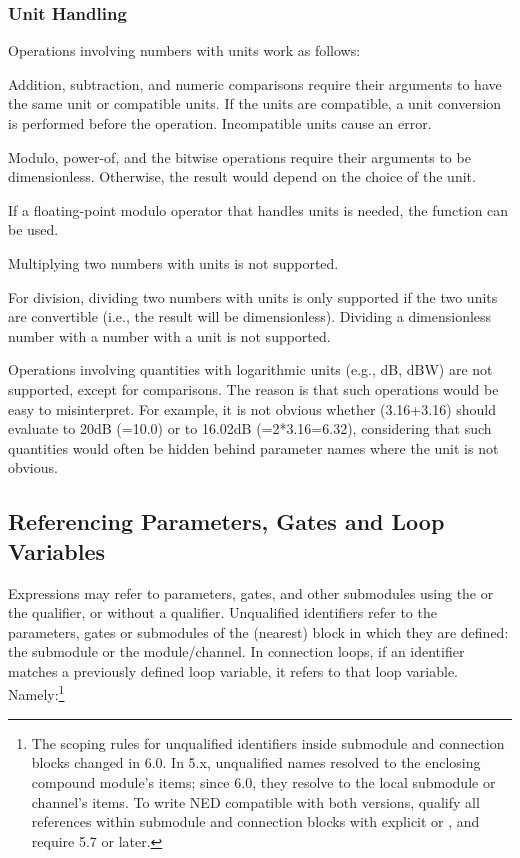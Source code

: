 \subsubsection{Unit Handling}
\label{sec:ned-ref:unit-handling}

Operations involving numbers with units work as follows:

Addition, subtraction, and numeric comparisons require their arguments to have
the same unit or compatible units. If the units are compatible, a unit
conversion is performed before the operation. Incompatible units cause an error.

Modulo, power-of, and the bitwise operations require their arguments to be
dimensionless. Otherwise, the result would depend on the choice of the unit.

\begin{note}
If a floating-point modulo operator that handles units is needed, the
 function can be used.
\end{note}

Multiplying two numbers with units is not supported.

For division, dividing two numbers with units is only supported if the two units
are convertible (i.e., the result will be dimensionless). Dividing a
dimensionless number with a number with a unit is not supported.

Operations involving quantities with logarithmic units (e.g., dB, dBW) are not
supported, except for comparisons. The reason is that such operations would be
easy to misinterpret. For example, it is not obvious whether 
(3.16+3.16) should evaluate to 20dB (=10.0) or to 16.02dB (=2*3.16=6.32),
considering that such quantities would often be hidden behind parameter names
where the unit is not obvious.


\subsection{Referencing Parameters, Gates and Loop Variables}
\label{sec:ned-ref:referencing-parameters-and-loop-variables}

Expressions may refer to parameters, gates, and other submodules using the
 or the  qualifier, or without a qualifier.
Unqualified identifiers refer to the parameters, gates or submodules of the
(nearest) block in which they are defined: the submodule or the module/channel.
In connection  loops, if an identifier matches a previously
defined loop variable, it refers to that loop variable.
Namely:\footnote{The scoping rules for unqualified identifiers inside submodule
and connection blocks changed in {\opp} 6.0. In 5.x, unqualified names resolved
to the enclosing compound module's items; since 6.0, they resolve to the local
submodule or channel's items. To write NED compatible with both versions, qualify
all references within submodule and connection blocks with explicit
 or , and require {\opp} 5.7 or later.}

